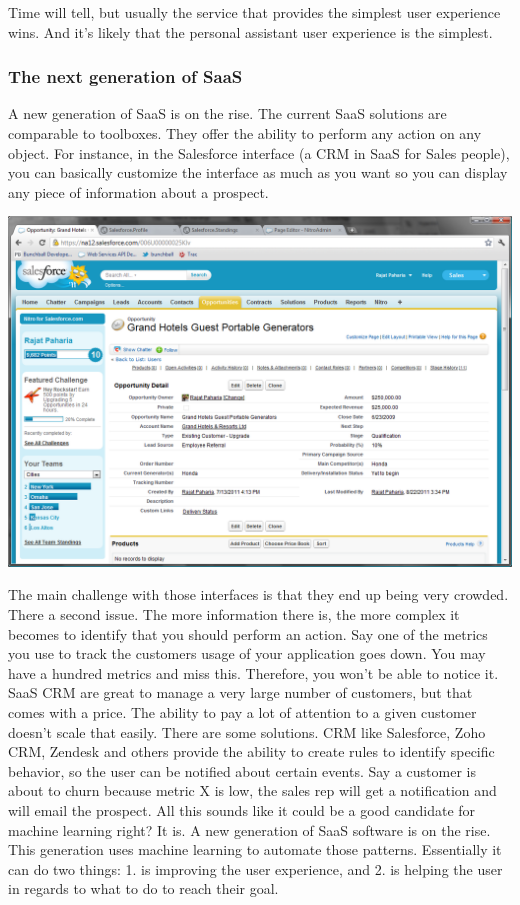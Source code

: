 \documentclass[12pt]{article}
\begin{document}
Time will tell, but usually the service that provides the simplest user
experience wins. And it's likely that the personal assistant user experience is
the simplest.


\subsubsection{The next generation of SaaS}

A new generation of SaaS is on the rise. The current SaaS solutions are comparable to toolboxes. They offer the ability to perform any action on any object. For instance, in the Salesforce interface (a CRM in SaaS for Sales people), you can basically customize the interface as much as you want so you can display any piece of information about a prospect.


\smallskip
\includegraphics[width=\textwidth]{salesforce}
\smallskip

The main challenge with those interfaces is that they end up being very crowded. There a second issue. The more information there is, the more complex it becomes to identify that you should perform an action. Say one of the metrics you use to track the customers usage of your application goes down. You may have a hundred metrics and miss this. Therefore, you won't be able to notice it.
SaaS CRM are great to manage a very large number of customers, but that comes with a price. The ability to pay a lot of attention to a given customer doesn't scale that easily.
There are some solutions. CRM like Salesforce, Zoho CRM, Zendesk and others provide the ability to create rules to identify specific behavior, so the user can be notified about certain events. Say a customer is about to churn because metric X is low, the sales rep will get a notification and will email the prospect.
All this sounds like it could be a good candidate for machine learning right? It is. A new generation of SaaS software is on the rise. This generation uses machine learning to automate those patterns. Essentially it can do two things: 1. is improving the user experience, and 2. is helping the user in regards to what to do to reach their goal.
\end{document}

